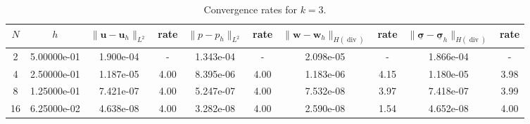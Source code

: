\begin{table}[ht!]
\centering
\begin{tabular}{c c c c c c c c c c}
\hline
$N$ & $h$ & $\|\mathbf{u}-\mathbf{u}_h\|_{L^2}$ & rate & $\|p-p_h\|_{L^2}$ & rate & $\|\mathbf{w}-\mathbf{w}_h\|_{H(\operatorname{div})}$ & rate & $\|\underline{\boldsymbol{\sigma}}-\underline{\boldsymbol{\sigma}}_h\|_{H(\operatorname{div})}$ & rate \\
\hline
2 & 5.00000e-01 & 1.900e-04 & - & 1.343e-04 & - & 2.098e-05 & - & 1.866e-04 & - \\
4 & 2.50000e-01 & 1.187e-05 & 4.00 & 8.395e-06 & 4.00 & 1.183e-06 & 4.15 & 1.180e-05 & 3.98 \\
8 & 1.25000e-01 & 7.421e-07 & 4.00 & 5.247e-07 & 4.00 & 7.532e-08 & 3.97 & 7.418e-07 & 3.99 \\
16 & 6.25000e-02 & 4.638e-08 & 4.00 & 3.282e-08 & 4.00 & 2.590e-08 & 1.54 & 4.652e-08 & 4.00 \\
\hline
\end{tabular}
\caption{Convergence rates for $k=3$.}
\label{tab:biot_convergence_single_k3}
\end{table}